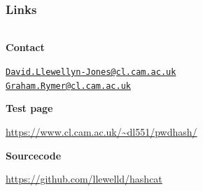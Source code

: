 \documentclass[handout, notes=hide]{beamer}
\newcommand{\emaillink}[1]{\href{mailto:#1}{\nolinkurl{#1}}}
\begin{document}
\begin{frame}
\frametitle{Links}
\framesubtitle{}
\setlength{\parskip}{0.5em}

\begin{columns}[T]
\begin{column}[T]{1.0\textwidth}
\setlength{\parskip}{0.5em}

\centering

{\bf Contact}

\emaillink{David.Llewellyn-Jones@cl.cam.ac.uk} \\
\emaillink{Graham.Rymer@cl.cam.ac.uk}

{\bf Test page}

\url{https://www.cl.cam.ac.uk/~dl551/pwdhash/}

{\bf Sourcecode}

\url{https://github.com/llewelld/hashcat}

\end{column}
\end{columns}


\end{frame}













\end{document}

